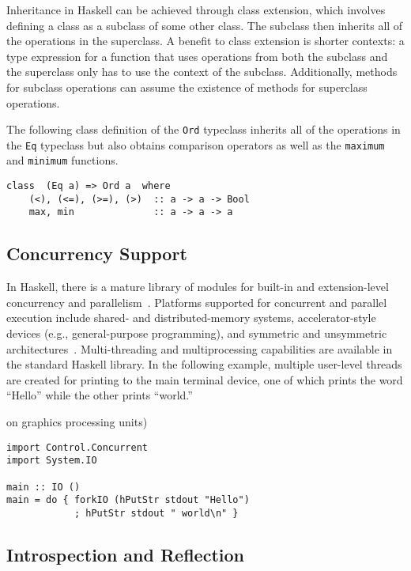\documentclass[titlepage,12pt]{article}
\begin{document}
Inheritance in Haskell can be achieved through class extension, which involves defining a class as a subclass 
of some other class. The subclass then inherits all of the operations in the superclass. A benefit to class 
extension is shorter contexts: a type expression for a function that uses operations from both the subclass 
and the superclass only has to use the context of the subclass. Additionally, methods for subclass 
operations can assume the existence of methods for superclass operations.

The following class definition of the \texttt{Ord} typeclass inherits all of the operations in the \texttt{Eq} typeclass but
also obtains comparison operators as well as the \texttt{maximum} and \texttt{minimum} functions.

\begin{verbatim}
class  (Eq a) => Ord a  where
    (<), (<=), (>=), (>)  :: a -> a -> Bool
    max, min              :: a -> a -> a
\end{verbatim}

\subsection{Concurrency Support}

In Haskell, there is a mature library of modules for built-in and extension-level
concurrency and parallelism~\cite{haskell-concurr}.  Platforms supported for concurrent and parallel execution include shared- and
distributed-memory systems, accelerator-style devices (e.g., general-purpose programming), and
symmetric and unsymmetric architectures~\cite{par-funk}.  Multi-threading and multiprocessing capabilities are available in
the standard Haskell library.  In the following example, multiple user-level threads are created for printing
to the main terminal device, one of which prints the word ``Hello'' while the other prints ``world.''

on graphics processing units)
\begin{verbatim}
import Control.Concurrent
import System.IO

main :: IO ()
main = do { forkIO (hPutStr stdout "Hello")
            ; hPutStr stdout " world\n" }
\end{verbatim}

\subsection{Introspection and Reflection}
\end{document}
